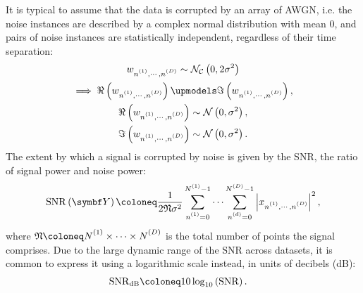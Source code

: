 It is typical to assume that the data is corrupted by an array of \ac{AWGN},
i.e. the noise instances are described by a complex normal distribution with
mean 0, and pairs of noise instances are statistically independent, regardless
of their time separation:
\begin{subequations}
    \begin{gather}
        \wnonenD \sim
        \mathcal{N_C}\left(0, 2\sigma^2\right) \\
        \begin{gathered}
            \implies \Re\left(\wnonenD\right) \upmodels \Im\left(\wnonenD\right),\\
             \Re\left(\wnonenD\right) \sim \mathcal{N}\left(0, \sigma^2\right),\\
             \Im\left(\wnonenD\right) \sim \mathcal{N}\left(0, \sigma^2\right). \\
        \end{gathered}
    \end{gather}
\end{subequations}
The extent by which a signal is corrupted by noise is given by the \ac{SNR},
the ratio of signal power and noise power:
\begin{equation}
    \SNR\left(\bY\right) \coloneq
        \frac{1}{2 \mathfrak{N} \sigma^2}
        \sum_{\none=0}^{\None-1} \cdots \sum_{\nd=0}^{\ND-1}
        \left \lvert \xnonenD \right \rvert^2,
\end{equation}
where $\mathfrak{N} \coloneq \None \times \cdots \times \ND$ is the total
number of points the signal comprises. Due to the large dynamic range of the
\ac{SNR} across datasets, it is common to express it using a logarithmic scale
instead, in units of decibels (\unit{\deci\bel}):
\begin{equation}
    \begin{split}
        \SNR_{\unit{\deci\bel}} &\coloneq 10 \log_{10} \left(\SNR\right).
    \end{split}
\end{equation}
